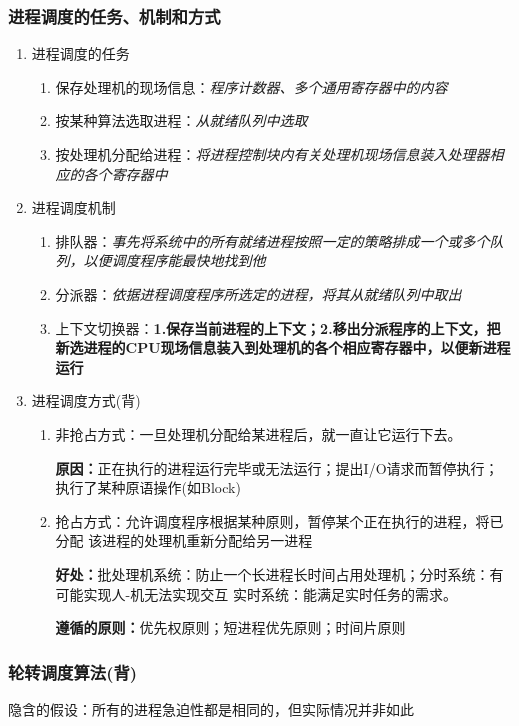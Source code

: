 \documentclass{article}
\begin{document}
\subsubsection{进程调度的任务、机制和{\color{red}方式}}
\begin{enumerate}
    \item 进程调度的任务
    \begin{enumerate}
        \item 保存处理机的现场信息：\textit{程序计数器、多个通用寄存器中的内容}
        \item 按某种算法选取进程：\textit{从就绪队列中选取}
        \item 按处理机分配给进程：\textit{将进程控制块内有关处理机现场信息装入处理器相应的各个寄存器中}
    \end{enumerate}
    \item 进程调度机制
    \begin{enumerate}
        \item 排队器：\textit{事先将系统中的所有就绪进程按照一定的策略排成一个或多个队列，以便调度程序能最快地找到他}
        \item 分派器：\textit{依据进程调度程序所选定的进程，将其从就绪队列中取出}
        \item 上下文切换器：\textbf{1.保存当前进程的上下文；2.移出分派程序的上下文，把新选进程的CPU现场信息装入到处理机的各个相应寄存器中，以便新进程运行}
    \end{enumerate}
    \item 进程调度方式{\color{green}(背)}
    \begin{enumerate}
        \item \label{非抢占式}非抢占方式：一旦处理机分配给某进程后，就一直让它运行下去。
        
        \textbf{原因：}正在执行的进程运行完毕或无法运行；提出I/O请求而暂停执行；执行了某种原语操作(如Block)
        \item \label{抢占式}抢占方式：允许调度程序根据某种原则，暂停某个正在执行的进程，将已分配
        该进程的处理机重新分配给另一进程

        \textbf{好处：}批处理机系统：防止一个长进程长时间占用处理机；分时系统：有可能实现人-机无法实现交互
        实时系统：能满足实时任务的需求。

        \textbf{遵循的原则：}优先权原则；短进程优先原则；时间片原则
    \end{enumerate}
\end{enumerate}
\subsubsection{{\color{red}轮转调度算法}{\color{green}(背)}}
隐含的假设：所有的进程急迫性都是相同的，但实际情况并非如此
\end{document}
